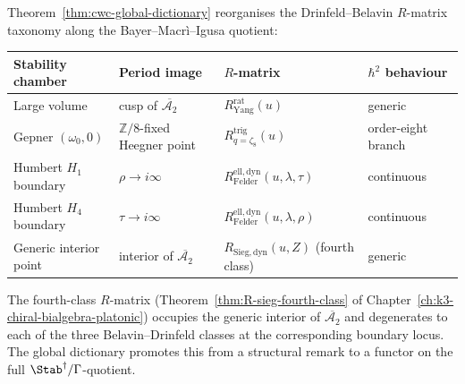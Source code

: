 \begin{remark}
\label{rem:cwc-three-tier}
Theorem~\ref{thm:cwc-global-dictionary} reorganises the
Drinfeld--Belavin $R$-matrix taxonomy along the Bayer--Macr\`i--Igusa
quotient:
\begin{center}
\renewcommand{\arraystretch}{1.2}
\begin{tabular}{llll}
\toprule
Stability chamber & Period image & $R$-matrix & $\hbar^2$ behaviour \\
\midrule
Large volume & cusp of $\overline{\mathcal{A}_2}$ &
 $R^{\mathrm{rat}}_{\mathrm{Yang}}(u)$ & generic \\
Gepner $(\omega_0,0)$ & $\mathbb{Z}/8$-fixed Heegner point &
 $R^{\mathrm{trig}}_{q=\zeta_8}(u)$ & order-eight branch \\
Humbert $H_1$ boundary & $\rho\to i\infty$ &
 $R^{\mathrm{ell,dyn}}_{\mathrm{Felder}}(u,\lambda,\tau)$ &
 continuous \\
Humbert $H_4$ boundary & $\tau\to i\infty$ &
 $R^{\mathrm{ell,dyn}}_{\mathrm{Felder}}(u,\lambda,\rho)$ &
 continuous \\
Generic interior point & interior of $\overline{\mathcal{A}_2}$ &
 $R_{\mathrm{Sieg,dyn}}(u,Z)$ (fourth class) & generic \\
\bottomrule
\end{tabular}
\end{center}
The fourth-class $R$-matrix
(Theorem~\ref{thm:R-sieg-fourth-class} of
Chapter~\ref{ch:k3-chiral-bialgebra-platonic}) occupies the generic
interior of $\overline{\mathcal{A}_2}$ and degenerates to each of the
three Belavin--Drinfeld classes at the corresponding boundary locus.
The global dictionary promotes this from a structural remark to a
functor on the full $\Stab^\dagger/\Gamma$-quotient.
\end{remark}

